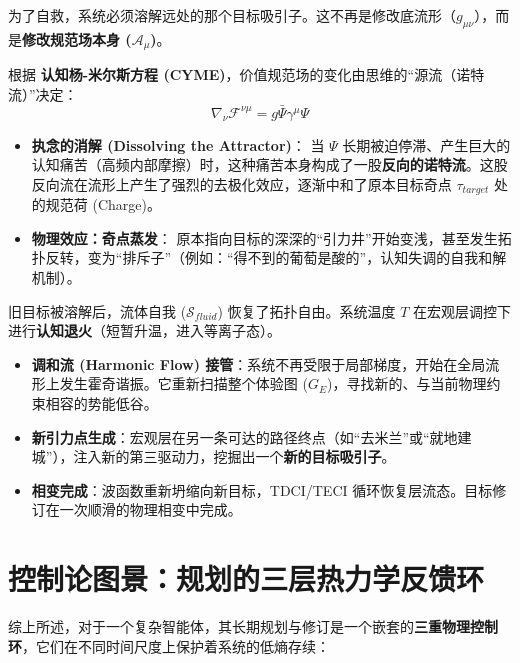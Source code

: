 
为了自救，系统必须溶解远处的那个目标吸引子。这不再是修改底流形（$g_{\mu\nu}$），而是\textbf{修改规范场本身 ($\mathcal{A}_\mu$)}。

根据 \textbf{认知杨-米尔斯方程 (CYME)}，价值规范场的变化由思维的“源流（诺特流）”决定：
$$ \nabla_\nu \mathcal{F}^{\nu\mu} = g \bar{\Psi} \gamma^\mu \Psi $$

\begin{itemize}
    \item \textbf{执念的消解 (Dissolving the Attractor)}：
    当 $\Psi$ 长期被迫停滞、产生巨大的认知痛苦（高频内部摩擦）时，这种痛苦本身构成了一股\textbf{反向的诺特流}。这股反向流在流形上产生了强烈的去极化效应，逐渐中和了原本目标奇点 $\tau_{target}$ 处的规范荷 (Charge)。

    \item \textbf{物理效应：奇点蒸发}：
    原本指向目标的深深的“引力井”开始变浅，甚至发生拓扑反转，变为“排斥子”（例如：“得不到的葡萄是酸的”，认知失调的自我和解机制）。
\end{itemize}


旧目标被溶解后，流体自我 ($\mathcal{S}_{fluid}$) 恢复了拓扑自由。系统温度 $T$ 在宏观层调控下进行\textbf{认知退火}（短暂升温，进入等离子态）。

\begin{itemize}
    \item \textbf{调和流 (Harmonic Flow) 接管}：系统不再受限于局部梯度，开始在全局流形上发生霍奇谐振。它重新扫描整个体验图 ($G_E$)，寻找新的、与当前物理约束相容的势能低谷。
    \item \textbf{新引力点生成}：宏观层在另一条可达的路径终点（如“去米兰”或“就地建城”），注入新的第三驱动力，挖掘出一个\textbf{新的目标吸引子}。
    \item \textbf{相变完成}：波函数重新坍缩向新目标，TDCI/TECI 循环恢复层流态。目标修订在一次顺滑的物理相变中完成。
\end{itemize}


\section{控制论图景：规划的三层热力学反馈环}
\label{sec:three_loops_of_planning}

综上所述，对于一个复杂智能体，其长期规划与修订是一个嵌套的\textbf{三重物理控制环}，它们在不同时间尺度上保护着系统的低熵存续：

